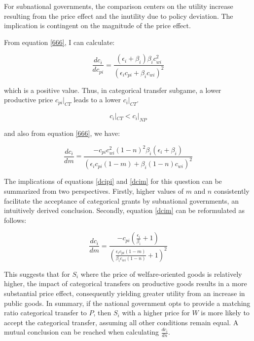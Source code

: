 
For subnational governments, the comparison centers on the utility increase resulting from the price effect and the inutility due to policy deviation. The implication is contingent on the magnitude of the price effect.%

From equation \ref{666}, I can calculate:

\begin{equation}
    \frac{dc_i}{dc_{pi}}=\frac{(\epsilon_i+\beta_i)\beta_i c_{wi}^2}{(\epsilon_ic_{pi}+\beta_i c_{wi})^2}\label{dcipi}
\end{equation}

which is a positive value. Thus, in categorical transfer subgame, a lower productive price $c_{pi}|_{CT}$ leads to a lower $c_i|_{CT}$.

\begin{equation}
    c_{i}|_{CT}<c_i|_{NP}\label{ctpnpp}
\end{equation}

and also from equation \ref{666}, we have:

\begin{equation}
    \frac{dc_i}{dm}=\frac{-c_{pi}c_{wi}^2(1-n)^2\beta_i(\epsilon_i+\beta_i)}{(\epsilon_i c_{pi} (1-m)+\beta_i(1-n) c_{wi})^2}\label{dcim}
\end{equation}

The implications of equations \ref{dcipi} and \ref{dcim} for this question can be summarized from two perspectives. Firstly, higher values of $m$ and $n$ consistently facilitate the acceptance of categorical grants by subnational governments, an intuitively derived conclusion. Secondly, equation \ref{dcim} can be reformulated as follows:

\begin{equation}
    \frac{d c_i}{d m}= \frac{-c_{pi}(\frac{\epsilon_i}{\beta_i}+1)}{(\frac{\epsilon_ic_{pi}(1-m)}{\beta_ic_{wi}(1-n)}+1)^2}
\end{equation}

This suggests that for $S_i$ where the price of welfare-oriented goods is relatively higher, the impact of categorical transfers on productive goods results in a more substantial price effect, consequently yielding greater utility from an increase in public goods. In summary, if the national government opts to provide a matching ratio categorical transfer to $P$, then $S_i$ with a higher price for $W$ is more likely to accept the categorical transfer, assuming all other conditions remain equal. A mutual conclusion can be reached when calculating $\frac{dc_i}{dn}$.

